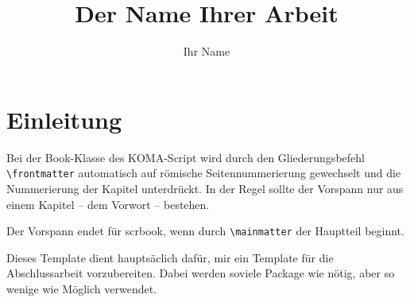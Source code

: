 \documentclass[a4paper,
openany,							%
toc=chapterentrywithdots
]
{scrbook}
\begin{document}


\title{Der Name Ihrer Arbeit}
\author{Ihr Name}



\maketitle 						%

\tableofcontents			%


\frontmatter					%
\chapter{Einleitung}

Bei der Book-Klasse des KOMA-Script wird durch den Gliederungsbefehl \verb#\frontmatter# automatisch auf römische Seitennummerierung gewechselt und die Nummerierung der Kapitel unterdrückt. In der Regel sollte der Vorspann nur aus einem Kapitel -- dem Vorwort -- bestehen.

Der Vorspann endet für scrbook, wenn durch \verb#\mainmatter# der Hauptteil beginnt.

Dieses Template dient hauptsäclich dafür, mir ein Template für die Abschlussarbeit vorzubereiten. Dabei werden soviele Package wie nötig, aber so wenige wie Möglich verwendet.
\end{document}
